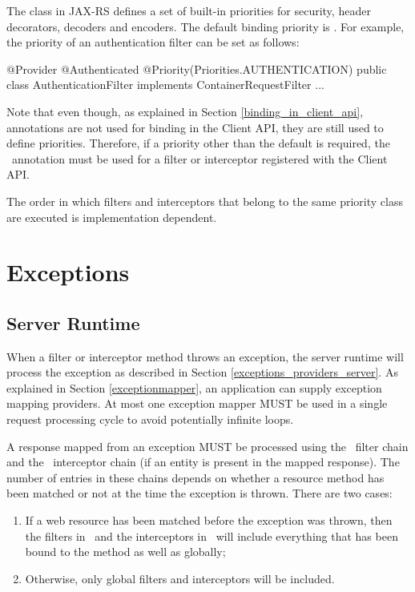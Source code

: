 The  class in JAX-RS defines a set of built-in priorities for security, header decorators, decoders and encoders. The default binding priority is . For example, the priority of an authentication filter can be set as follows:

\begin{listing}{1}
@Provider
@Authenticated
@Priority(Priorities.AUTHENTICATION)
public class AuthenticationFilter implements ContainerRequestFilter {
    ...
}
\end{listing}

Note that even though, as explained in Section \ref{binding_in_client_api}, annotations are not used for binding in the Client API, they are still used to define priorities. Therefore, if a priority other than the default is required, the \Priority\ annotation must be used for a filter or interceptor registered with the Client API. 

The order in which filters and interceptors that belong to the same priority class are executed is implementation dependent.

\section{Exceptions}
\label{exceptions_filters_and_interceptors}

\subsection{Server Runtime}

When a filter or interceptor method throws an exception, the server runtime will process the exception as described in Section \ref{exceptions_providers_server}. As explained in Section \ref{exceptionmapper}, an application can supply exception mapping providers. At most one exception mapper MUST be used in a single request processing cycle to avoid potentially infinite loops. 

A response mapped from an exception MUST be processed using the \ContainerResponse\ filter chain and the \WriteTo\ interceptor chain (if an entity is present in the mapped response). The number of entries in these chains depends on whether a resource method has been matched or not at the time the exception is thrown. There are two cases:

\begin{enumerate}
\item If a web resource has been matched before the exception was thrown, then the filters in \ContainerResponse\ and the interceptors in \WriteTo\ will include everything that has been bound to the method as well as globally;
\item\label{no_matching} Otherwise, only global filters and interceptors will be included.
\end{enumerate}

